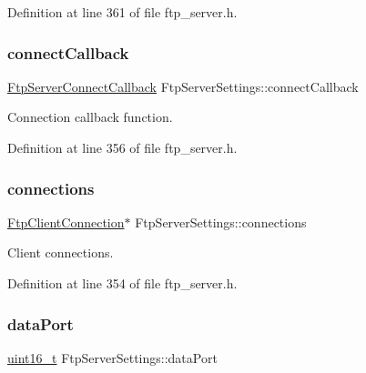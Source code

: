 Definition at line 361 of file ftp\+\_\+server.\+h.

\mbox{\label{structFtpServerSettings_a3ce9af486eb03a9a3fe571778d259e58}} 
\subsubsection{\texorpdfstring{connect\+Callback}{connectCallback}}
{\footnotesize\ttfamily \hyperlink{ftp__server_8h_a333315b35e4f2859c06be47407822984}{Ftp\+Server\+Connect\+Callback} Ftp\+Server\+Settings\+::connect\+Callback}



Connection callback function. 



Definition at line 356 of file ftp\+\_\+server.\+h.

\mbox{\label{structFtpServerSettings_aa978284727ae89147f970d349b7d36b1}} 
\subsubsection{\texorpdfstring{connections}{connections}}
{\footnotesize\ttfamily \hyperlink{ftp__server_8h_ab682699c15473841571a42c3df57e9d2}{Ftp\+Client\+Connection}$\ast$ Ftp\+Server\+Settings\+::connections}



Client connections. 



Definition at line 354 of file ftp\+\_\+server.\+h.

\mbox{\label{structFtpServerSettings_ab762670572bc8baa139a71e62cf3fa0f}} 
\subsubsection{\texorpdfstring{data\+Port}{dataPort}}
{\footnotesize\ttfamily \hyperlink{stdint_8h_a273cf69d639a59973b6019625df33e30}{uint16\+\_\+t} Ftp\+Server\+Settings\+::data\+Port}



